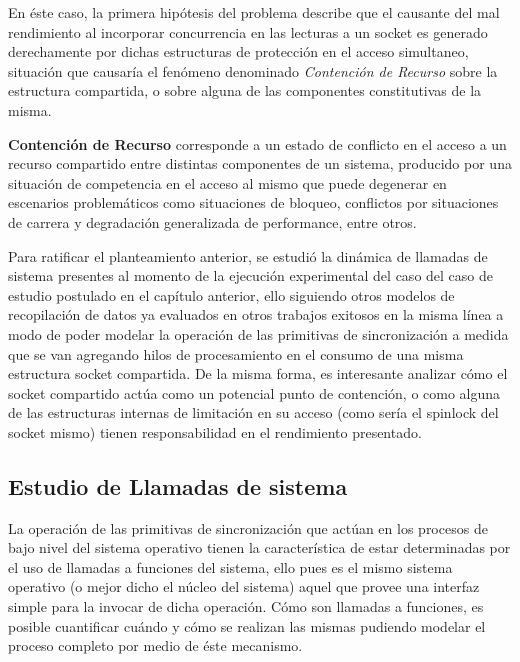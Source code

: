 En éste caso, la primera hipótesis del problema describe que el causante del mal rendimiento al incorporar concurrencia en las lecturas a un socket es generado derechamente por dichas estructuras de protección en el acceso simultaneo, situación que causaría el fenómeno denominado \emph{Contención de Recurso} sobre la estructura compartida, o sobre alguna de las componentes constitutivas de la misma.

\begin{defn} \textbf{Contención de Recurso} corresponde a un estado de conflicto en el acceso a un recurso compartido entre distintas componentes de un sistema, producido por una situación de competencia en el acceso al mismo que puede degenerar en escenarios problemáticos como situaciones de bloqueo, conflictos por situaciones de carrera y degradación generalizada de performance, entre otros.
\end{defn}

Para ratificar el planteamiento anterior, se estudió la dinámica de llamadas de sistema presentes al momento de la ejecución experimental del caso del caso de estudio postulado en el capítulo anterior, ello siguiendo otros modelos de recopilación de datos ya evaluados en otros trabajos exitosos en la misma línea \cite{slides:hpPerf} a modo de poder modelar la operación de las primitivas de sincronización a medida que se van agregando hilos de procesamiento en el consumo de una misma estructura socket compartida. De la misma forma, es interesante analizar cómo el socket compartido actúa como un potencial punto de contención, o como alguna de las estructuras internas de limitación en su acceso (como sería el spinlock del socket mismo) tienen responsabilidad en el rendimiento presentado.

\subsection{Estudio de Llamadas de sistema}

La operación de las primitivas de sincronización que actúan en los procesos de bajo nivel del sistema operativo tienen la característica de estar determinadas por el uso de llamadas a funciones del sistema, ello pues es el mismo sistema operativo (o mejor dicho el núcleo del sistema) aquel que provee una interfaz simple para la invocar de dicha operación. Cómo son llamadas a funciones, es posible cuantificar cuándo y cómo se realizan las mismas pudiendo modelar el proceso completo por medio de éste mecanismo.

